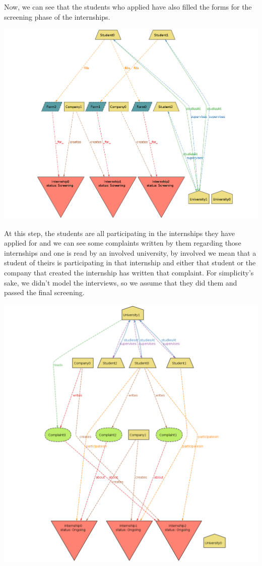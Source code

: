 \documentclass[11pt,twoside]{article}
\begin{document}
\newpage
Now, we can see that the students who applied have also filled the forms for the screening phase of the internships.
\begin{center}
\includegraphics[width=\textwidth]{Images/Scene_step1}
\end{center}
\newpage
At this step, the students are all participating in the internships they have applied for and we can see some complaints written by them regarding those internships and one is read by an involved university, by involved we mean that a student of theirs is participating in that internship and either that student or the company that created the internship has written that complaint. For simplicity's sake, we didn't model the interviews, so we assume that they did them and passed the final screening.
\begin{center}
\includegraphics[width=\textwidth]{Images/Scene_step2}
\end{center}
\end{document}
